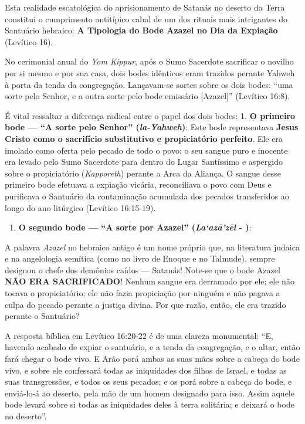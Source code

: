 Esta realidade escatológica do aprisionamento de Satanás no deserto da Terra constitui o cumprimento antitípico cabal de um dos rituais mais intrigantes do Santuário hebraico: \textbf{A Tipologia do Bode Azazel no Dia da Expiação} (Levítico 16).

No cerimonial anual do \textit{Yom Kippur}, após o Sumo Sacerdote sacrificar o novilho por si mesmo e por sua casa, dois bodes idênticos eram trazidos perante Yahweh à porta da tenda da congregação. Lançavam-se sortes sobre os dois bodes: ``uma sorte pelo Senhor, e a outra sorte pelo bode emissário [Azazel]'' (Levítico 16:8).

É vital ressaltar a diferença radical entre o papel dos dois bodes:
1. \textbf{O primeiro bode — ``A sorte pelo Senhor'' (\textit{la-Yahweh})}: Este bode representava \textbf{Jesus Cristo como o sacrifício substitutivo e propiciatório perfeito}. Ele era imolado como oferta pelo pecado de todo o povo; o seu sangue puro e inocente era levado pelo Sumo Sacerdote para dentro do Lugar Santíssimo e aspergido sobre o propiciatório (\textit{Kapporeth}) perante a Arca da Aliança. O sangue desse primeiro bode efetuava a expiação vicária, reconciliava o povo com Deus e purificava o Santuário da contaminação acumulada dos pecados transferidos ao longo do ano litúrgico (Levítico 16:15-19).
\begin{enumerate}
  \item \textbf{O segundo bode — ``A sorte por Azazel'' (\textit{La‘azā’zēl} - )}:
\end{enumerate}

A palavra \textit{Azazel} no hebraico antigo é um nome próprio que, na literatura judaica e na angelologia semítica (como no livro de Enoque e no Talmude), sempre designou o chefe dos demônios caídos — Satanás!
Note-se que o bode Azazel \textbf{NÃO ERA SACRIFICADO}! Nenhum sangue era derramado por ele; ele não tocava o propiciatório; ele não fazia propiciação por ninguém e não pagava a culpa do pecado perante a justiça divina. Por que razão, então, ele era trazido perante o Santuário?

A resposta bíblica em Levítico 16:20-22 é de uma clareza monumental:
``E, havendo acabado de expiar o santuário, e a tenda da congregação, e o altar, então fará chegar o bode vivo. E Arão porá ambas as suas mãos sobre a cabeça do bode vivo, e sobre ele confessará todas as iniquidades dos filhos de Israel, e todas as suas transgressões, e todos os seus pecados; e os porá sobre a cabeça do bode, e enviá-lo-á ao deserto, pela mão de um homem designado para isso. Assim aquele bode levará sobre si todas as iniquidades deles à terra solitária; e deixará o bode no deserto''.

